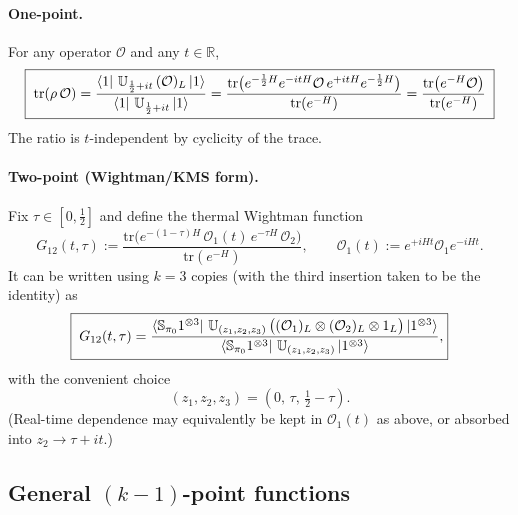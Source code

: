 \documentclass{article}
\theoremstyle{definition}
\newcommand{\mO}{\mathcal{O}}
\newcommand{\tr}{\text{tr}}
\begin{document}
    \paragraph{One-point.}
    For any operator $\mO$ and any $t\in\mathbb{R}$,
    \begin{equation}
        \label{1ptthermal}\boxed{\; \tr(\rho\,\mO) =\frac{\bra{1}\,\mathbb{U}_{\frac{1}{2}+i t}\,(\mO)_{L}\ket{1}}{\bra{1}\,\mathbb{U}_{\frac{1}{2}+i t}\ket{1}} =\frac{\tr\big(e^{-\frac{1}{2}H}e^{-i tH}\mO\,e^{+i tH}e^{-\frac{1}{2}H}\big)}{\tr(e^{-H})}=\frac{\tr\big(e^{-H}\mO\big)}{\tr(e^{-H})}\;}
    \end{equation}
    The ratio is $t$-independent by cyclicity of the trace.

    \paragraph{Two-point (Wightman/KMS form).}
    Fix $\tau\in[0,\tfrac12]$ and define the thermal Wightman function
    \begin{equation}
        \label{2ptthermal}G_{12}(t,\tau):=\frac{\tr\big(e^{-(1-\tau)H}\,\mO_{1}(t)\,e^{-\tau
        H}\,\mO_{2}\big)}{\tr(e^{-H})}, \qquad \mO_{1}(t):=e^{+iHt}\mO_{1}e^{-iHt}
        .
    \end{equation}
    It can be written using $k=3$ copies (with the third insertion taken to be the
    identity) as
    \begin{equation}
        \boxed{\; G_{12}(t,\tau) =\frac{\bra{\mathbb{S}_{\pi_0}1^{\otimes 3}}\,\mathbb{U}_{(z_1,z_2,z_3)}\,\big((\mO_{1})_{L}\otimes (\mO_{2})_{L}\otimes 1_{L}\big)\ket{1^{\otimes 3}}}{\bra{\mathbb{S}_{\pi_0}1^{\otimes 3}}\,\mathbb{U}_{(z_1,z_2,z_3)}\ket{1^{\otimes 3}}} ,}
    \end{equation}
    with the convenient choice
    \begin{equation}
        (z_{1},z_{2},z_{3})=(0,\,\tau,\,\tfrac12-\tau).
    \end{equation}
    (Real-time dependence may equivalently be kept in $\mO_{1}(t)$ as above, or
    absorbed into $z_{2}\to \tau+i t$.)

    \subsection*{General $(k\! -\! 1)$-point functions}
\end{document}
